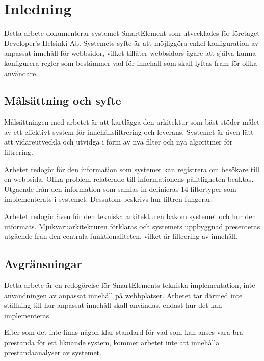 \section{Inledning}

Detta arbete dokumenterar systemet SmartElement som utvecklades för företaget Developer’s Helsinki Ab. Systemets syfte är att möjliggöra enkel konfiguration av anpassat innehåll för webbsidor, vilket tillåter webbsidors ägare att själva kunna konfigurera regler som bestämmer vad för innehåll som skall lyftas fram för olika användare.

\subsection{Målsättning och syfte}

Målsättningen med arbetet är att kartlägga den arkitektur som bäst stöder målet av ett effektivt system för innehållsfiltrering och leverans. Systemet är även lätt att vidareutveckla och utvidga i form av nya filter och nya algoritmer för filtrering.

Arbetet redogör för den information som systemet kan registrera om besökare till en webbsida. Olika problem relaterade till informationens pålitligheten beaktas. Utgående från den information som samlas in definieras 14 filtertyper som implementerats i systemet. Dessutom beskrivs hur filtren fungerar. 

Arbetet redogör även för den tekniska arkitekturen bakom systemet och hur den utformats. Mjukvaruarkitekturen förklaras och systemets uppbyggnad presenteras utgående från den centrala funktionaliteten, vilket är filtrering av innehåll.

\subsection{Avgränsningar}

Detta arbete är en redogörelse för SmartElements tekniska implementation, inte användningen av anpassat innehåll på webbplatser. Arbetet tar därmed inte ställning till hur anpassat innehåll skall användas, endast hur det kan implementeras.

Efter som det inte finns någon klar standard för vad som kan anses vara bra prestanda för ett liknande system, kommer arbetet inte att innehålla prestandaanalyser av systemet.

